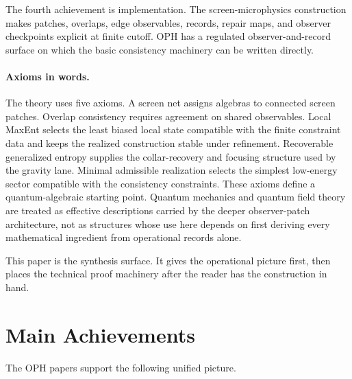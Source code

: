\documentclass[11pt]{article}
\begin{document}
The fourth achievement is implementation. The screen-microphysics construction makes patches,
overlaps, edge observables, records, repair maps, and observer checkpoints explicit at finite
cutoff. OPH has a regulated observer-and-record surface on which the basic consistency machinery can
be written directly.

\paragraph{Axioms in words.}
The theory uses five axioms. A screen net assigns algebras to connected screen patches. Overlap
consistency requires agreement on shared observables. Local MaxEnt selects the least biased local
state compatible with the finite constraint data and keeps the realized construction stable under
refinement. Recoverable generalized entropy supplies the collar-recovery and focusing structure
used by the gravity lane. Minimal admissible realization selects the simplest low-energy sector
compatible with the consistency constraints. These axioms define a quantum-algebraic
starting point. Quantum mechanics and quantum field theory are treated as effective descriptions
carried by the deeper observer-patch architecture, not as structures whose use here depends on
first deriving every mathematical ingredient from operational records alone.

This paper is the synthesis surface. It gives the operational picture first, then places the
technical proof machinery after the reader has the construction in hand.

\section{Main Achievements}

The OPH papers support the following unified picture.
\end{document}
